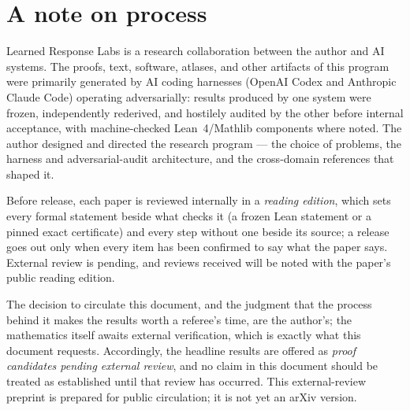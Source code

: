 \documentclass[11pt]{article}
\theoremstyle{definition}
\begin{document}
\section*{A note on process}
Learned Response Labs is a research collaboration between the author and AI systems.
The proofs, text, software, atlases, and other artifacts of this program were primarily
generated by AI coding harnesses (OpenAI Codex and Anthropic Claude Code) operating
adversarially: results produced by one system were frozen, independently rederived,
and hostilely audited by the other before internal acceptance, with machine-checked
Lean~4/Mathlib components where noted. The author designed and directed the research
program --- the choice of problems, the harness and adversarial-audit architecture, and
the cross-domain references that shaped it. \par Before release, each paper is
reviewed internally in a \emph{reading edition}, which sets every formal statement
beside what checks it (a frozen Lean statement or a pinned exact certificate) and
every step without one beside its source; a release goes out only when every item
has been confirmed to say what the paper says. External review is pending, and
reviews received will be noted with the paper's public reading
edition.
\par The decision to circulate
this document, and the judgment that the process behind it makes the results worth a
referee's time, are the author's; the mathematics itself awaits external verification,
which is exactly what this document requests. Accordingly, the headline results are
offered as \emph{proof candidates pending external review}, and no claim in this document
should be treated as established until that review has occurred. This external-review
preprint is prepared for public circulation; it is not yet an arXiv version.
\end{document}
